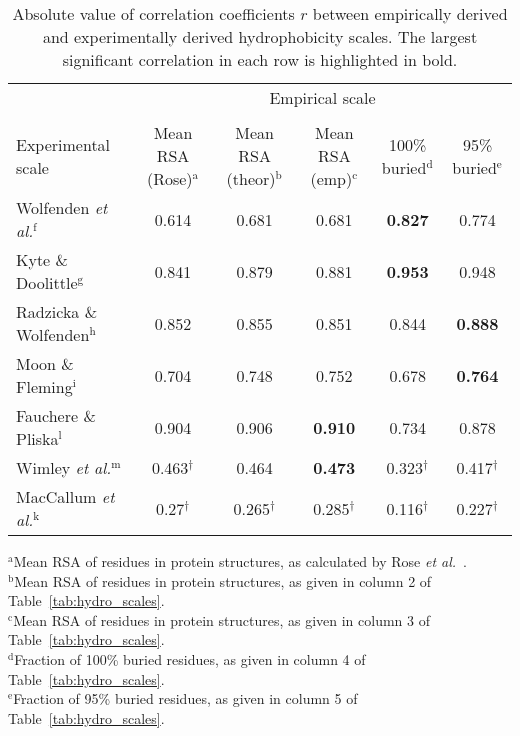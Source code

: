 \documentclass[11pt]{article}
\begin{document}
\begin{table}[H]
\caption{\label{tab:Corr}Absolute value of correlation coefficients $r$ between empirically derived and experimentally derived hydrophobicity scales. The largest significant correlation in each row is highlighted in bold.}
\begin{center}
\footnotesize
\begin{tabular}{lccccc}
 & \multicolumn{5}{c}{Empirical scale} \\ \cline{2-6}\\[-2ex]
Experimental scale & Mean RSA (Rose)$^\text{a}$ & Mean RSA (theor)$^\text{b}$ & Mean RSA (emp)$^\text{c}$ & 100\% buried$^\text{d}$ & 95\% buried$^\text{e}$\\
\hline
Wolfenden \emph{et al.}$^\text{f}$ & 0.614 & 0.681 & 0.681 & \textbf{0.827} & 0.774 \\
Kyte \& Doolittle$^\text{g}$ & 0.841 & 0.879 & 0.881 & \textbf{0.953} & 0.948 \\
Radzicka \& Wolfenden$^\text{h}$ & 0.852 & 0.855 & 0.851 & 0.844 & \textbf{0.888} \\
Moon \& Fleming$^\text{i}$ & 0.704 & 0.748 & 0.752 & 0.678 & \bf{0.764} \\
Fauchere \& Pliska$^\text{l}$ & 0.904 & 0.906 & \textbf{0.910} & 0.734 & 0.878 \\
Wimley \emph{et al.}$^\text{m}$ & 0.463$^\dagger$ & 0.464 & \textbf{0.473} & 0.323$^\dagger$ & 0.417$^\dagger$ \\
MacCallum \emph{et al.}$^\text{k}$ & 0.27$^\dagger$ & 0.265$^\dagger$ & 0.285$^\dagger$ & 0.116$^\dagger$ & 0.227$^\dagger$ \\
\hline
\end{tabular}
\end{center}
{\footnotesize
\begin{raggedright}
$^\text{a}$Mean RSA of residues in protein structures, as calculated by Rose \emph{et al.}~\cite{Rose1985}.\\
$^\text{b}$Mean RSA of residues in protein structures, as given in column 2 of Table~\ref{tab:hydro_scales}.\\ 
$^\text{c}$Mean RSA of residues in protein structures, as given in column 3 of Table~\ref{tab:hydro_scales}.\\
$^\text{d}$Fraction of 100\% buried residues, as given in column 4 of Table~\ref{tab:hydro_scales}.\\
$^\text{e}$Fraction of 95\% buried residues, as given in column 5 of Table~\ref{tab:hydro_scales}.\\

\end{raggedright}}
\end{table}
\end{document}
